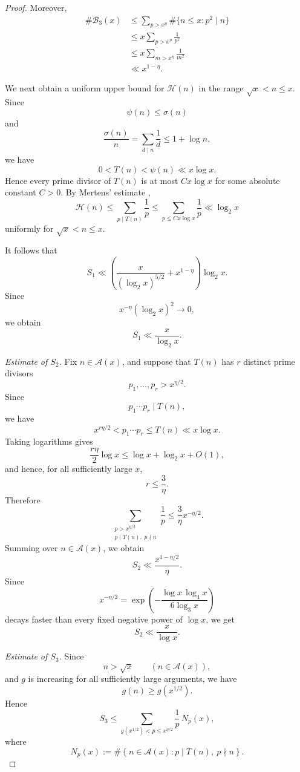 \documentclass{article}
\begin{document}
\begin{proof}
Moreover,
\[
\begin{aligned}
\#\mathcal B_3(x)
&\le
\sum_{p>x^\eta}
\#\{n\le x:p^2\mid n\}\\
&\le
x\sum_{p>x^\eta}\frac1{p^2}\\
&\le
x\sum_{m>x^\eta}\frac1{m^2}\\
&\ll
x^{1-\eta}.
\end{aligned}
\]

We next obtain a uniform upper bound for $\mathcal H(n)$ in the
range $\sqrt{x}<n\le x$. Since
\[
\psi(n)\le\sigma(n)
\]
and
\[
\frac{\sigma(n)}n
=
\sum_{d\mid n}\frac1d
\le
1+\log n,
\]
we have
\[
0<T(n)<\psi(n)\ll x\log x.
\]
Hence every prime divisor of $T(n)$ is at most $Cx\log x$ for some
absolute constant $C>0$. By Mertens' estimate \cite{ref9},
\[
\mathcal H(n)
\le
\sum_{p\mid T(n)}\frac1p
\le
\sum_{p\le Cx\log x}\frac1p
\ll
\log_2x
\]
uniformly for $\sqrt{x}<n\le x$.

It follows that
\[
S_1
\ll
\left(
\frac{x}{(\log_2x)^{5/2}}
+
x^{1-\eta}
\right)\log_2x.
\]
Since
\[
x^{-\eta}(\log_2x)^2\longrightarrow0,
\]
we obtain
\begin{equation}
S_1
\ll
\frac{x}{\log_2x}.
\label{eq:H-S1}
\end{equation}

\medskip
\noindent
\textit{Estimate of $S_2$.}
Fix $n\in\mathcal A(x)$, and suppose that $T(n)$ has $r$ distinct
prime divisors
\[
p_1,\ldots,p_r>x^{\eta/2}.
\]
Since
\[
p_1\cdots p_r\mid T(n),
\]
we have
\[
x^{r\eta/2}
<
p_1\cdots p_r
\le
T(n)
\ll
x\log x.
\]
Taking logarithms gives
\[
\frac{r\eta}{2}\log x
\le
\log x+\log_2x+O(1),
\]
and hence, for all sufficiently large $x$,
\[
r\le\frac3\eta.
\]
Therefore
\[
\sum_{\substack{
p>x^{\eta/2}\\
p\mid T(n),\;p\nmid n}}
\frac1p
\le
\frac3\eta x^{-\eta/2}.
\]
Summing over $n\in\mathcal A(x)$, we obtain
\[
S_2
\ll
\frac{x^{1-\eta/2}}{\eta}.
\]
Since
\[
x^{-\eta/2}
=
\exp\left(
-\frac{\log x\,\log_4x}
{6\log_3x}
\right)
\]
decays faster than every fixed negative power of $\log x$, we get
\begin{equation}
S_2
\ll
\frac{x}{\log x}.
\label{eq:H-S2}
\end{equation}

\medskip
\noindent
\textit{Estimate of $S_3$.}
Since
\[
n>\sqrt{x}
\qquad
(n\in\mathcal A(x)),
\]
and $g$ is increasing for all sufficiently large arguments, we have
\[
g(n)\ge g(x^{1/2}).
\]
Hence
\[
S_3
\le
\sum_{g(x^{1/2})<p\le x^{\eta/2}}
\frac1p\,N_p(x),
\]
where
\[
N_p(x)
:=
\#\left\{
n\in\mathcal A(x):
p\mid T(n),\ p\nmid n
\right\}.
\]


\end{proof}
\end{document}
